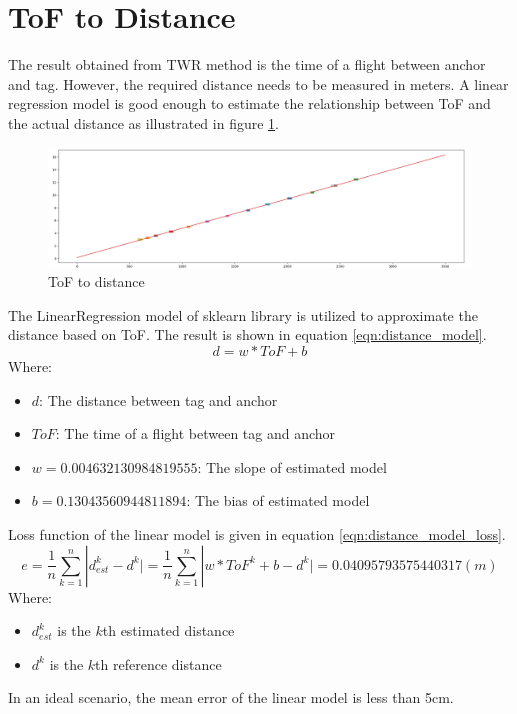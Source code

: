 \documentclass[\main/thesis.tex]{subfiles}
\begin{document}
\section{ToF to Distance}
The result obtained from TWR method is the time of a flight between anchor and tag. However, the required distance needs to be measured in meters. A linear regression model is good enough to estimate the relationship between ToF and the actual distance as illustrated in figure \ref{fig:tof_to_distance}.
\begin{figure}[H]
    \begin{center}
        \includegraphics[width=1\textwidth]{tof_to_distance.png}
    \end{center}
    \caption{ToF to distance}
    \label{fig:tof_to_distance}
\end{figure}
The LinearRegression model of sklearn library is utilized to approximate the distance based on ToF. The result is shown in equation \ref{eqn:distance_model}.
\begin{equation}
    d = w*ToF + b
    \label{eqn:distance_model}
\end{equation}
Where:
\begin{itemize}
    \item $d$: The distance between tag and anchor
    \item $ToF$: The time of a flight between tag and anchor
    \item $w = 0.004632130984819555$: The slope of estimated model 
    \item $b = 0.13043560944811894$: The bias of estimated model
\end{itemize}

Loss function of the linear model is given in equation \ref{eqn:distance_model_loss}.
\begin{equation}
    e = \frac{1}{n} \sum_{k = 1}^{n} | d^k_{est}-d^k \vert = \frac{1}{n} \sum_{k = 1}^{n} | w*ToF^k + b -d^k \vert  = 0.04095793575440317 (m)
    \label{eqn:distance_model_loss}
\end{equation}
Where:
\begin{itemize}
    \item $d^k_{est}$ is the $k$th estimated distance
    \item $d^k$ is the $k$th reference distance
\end{itemize}

In an ideal scenario, the mean error of the linear model is less than 5cm.
\end{document}
